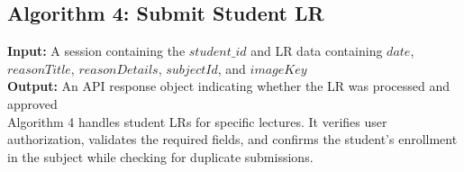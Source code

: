 
\subsection{Algorithm 4: Submit Student LR}

\textbf{Input:} A session containing the $student\_id$ and LR data containing $date$, $reasonTitle$, $reasonDetails$, $subjectId$, and $imageKey$ \\
\textbf{Output:} An API response object indicating whether the LR was processed and approved \\

Algorithm 4 handles student LRs for specific lectures. It verifies user authorization, validates the required fields, and confirms the student's enrollment in the subject while checking for duplicate submissions.


